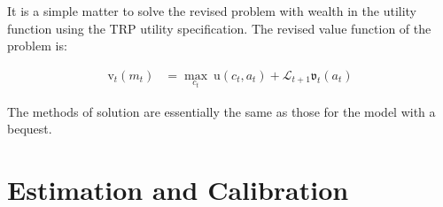 \documentclass{article}
\newcommand{\uFunc}{\mathrm{u}}
\newcommand{\vFunc}{\mathrm{v}}
\newcommand{\Alive}{\mathcal{L}}
\newcommand{\tranShkEmp}{\xi}
\newcommand{\cNrm}{c}
\newcommand{\RNrm}{\mathcal{R}}
\newcommand{\aNrm}{a}
\newcommand{\mNrm}{m}
\begin{document}

It is a simple matter to solve the revised problem with wealth in the utility function using the TRP utility specification. The revised value function of the problem is:


\begin{equation}
\begin{align}
    {\vFunc}_{t}({\mNrm}_{t}) & = \max_{\cNrm_{t}} ~ \uFunc(\cNrm_{t}, \aNrm_{t})+\Alive_{t+1}\mathfrak{v}_{t}(a_{t})
\end{align}
\end{equation}

The methods of solution are essentially the same as those for the model with a bequest.


\section{Estimation and Calibration}
\end{document}

